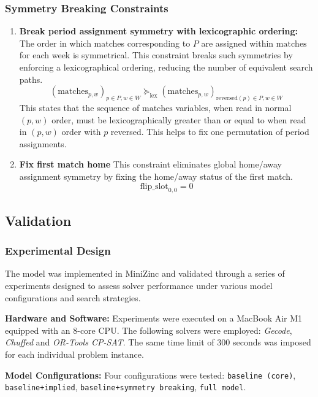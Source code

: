 \subsubsection{Symmetry Breaking Constraints}

\begin{enumerate}
    \item \textbf{Break period assignment symmetry with lexicographic ordering:} The order in which matches corresponding to $P$ are assigned within $\text{matches}$ for each week is symmetrical. This constraint breaks such symmetries by enforcing a lexicographical ordering, reducing the number of equivalent search paths.
    \[ (\text{matches}_{p, w})_{p \in P, w \in W} \succeq_{\text{lex}} (\text{matches}_{p, w})_{\text{reversed}(p) \in P, w \in W} \]
    This states that the sequence of $\text{matches}$ variables, when read in normal $(p,w)$ order, must be lexicographically greater than or equal to when read in $(p,w)$ order with $p$ reversed. This helps to fix one permutation of period assignments.

    \item \textbf{Fix first match home} This constraint eliminates global home/away assignment symmetry by fixing the home/away status of the first match.
    \[ \text{flip\_slot}_{0, 0} = 0 \]


\end{enumerate}

\subsection{Validation}

\subsubsection{Experimental Design}

The model was implemented in MiniZinc and validated through a series of experiments designed to assess solver performance under various model configurations and search strategies.

\textbf{Hardware and Software:}
Experiments were executed on a MacBook Air M1 equipped with an 8-core CPU. The following solvers were employed: \textit{Gecode}, \textit{Chuffed} and \textit{OR-Tools CP-SAT}. 
The same time limit of $300$ seconds was imposed for each individual problem instance.

\textbf{Model Configurations:}
Four configurations were tested: \texttt{baseline (core)}, \texttt{baseline+implied}, \texttt{baseline+symmetry breaking}, \texttt{full model}.


